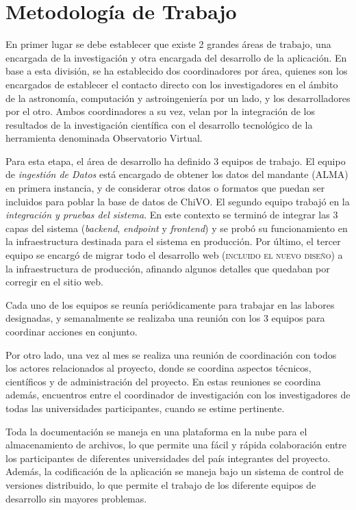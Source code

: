\section{Metodología de Trabajo}

En primer lugar se debe establecer que existe 2 grandes áreas de trabajo, una
encargada de la investigación y otra encargada del desarrollo de la aplicación.
En base a esta división, se ha establecido dos coordinadores por área, quienes
son los encargados de establecer el contacto directo con los investigadores en
el ámbito de la astronomía, computación y astroingeniería por un lado, y los
desarrolladores por el otro. Ambos coordinadores a su vez, velan por la
integración de los resultados de la investigación científica con el desarrollo
tecnológico de la herramienta denominada Observatorio Virtual.

Para esta etapa, el área de desarrollo ha definido 3 equipos de trabajo.
El equipo de \emph{ingestión de Datos} está encargado de obtener los 
datos del mandante (ALMA) en primera instancia, y de considerar otros datos
o formatos que puedan ser incluidos para poblar la base de datos de ChiVO. 
El segundo equipo trabajó en la \emph{integración y pruebas del sistema}. 
En este contexto se terminó de integrar las 3 capas del sistema (\emph{backend}, \emph{endpoint} y
\emph{frontend}) y se probó su funcionamiento en la infraestructura destinada
para el sistema en producción. Por último, el tercer equipo se encargó de migrar todo el
desarrollo web (\textsc{incluido el nuevo diseño}) a la infraestructura de
producción, afinando algunos detalles que quedaban por corregir en el sitio web.

Cada uno de los equipos se reunía periódicamente para trabajar en las labores
designadas, y semanalmente se realizaba una reunión con los 3 equipos para
coordinar acciones en conjunto.

Por otro lado, una vez al mes se realiza una reunión de coordinación con todos
los actores relacionados al proyecto, donde se coordina aspectos técnicos,
científicos y de administración del proyecto. En estas reuniones se coordina
además, encuentros entre el coordinador de investigación con los investigadores
de todas las universidades participantes, cuando se estime pertinente.

Toda la documentación se maneja en una plataforma en la nube para el
almacenamiento de archivos, lo que permite una fácil y rápida colaboración entre
los participantes de diferentes universidades del país integrantes del proyecto.
Además, la codificación de la aplicación se maneja bajo un sistema de control de
versiones distribuido, lo que permite el trabajo de los diferente equipos de
desarrollo sin mayores problemas.

